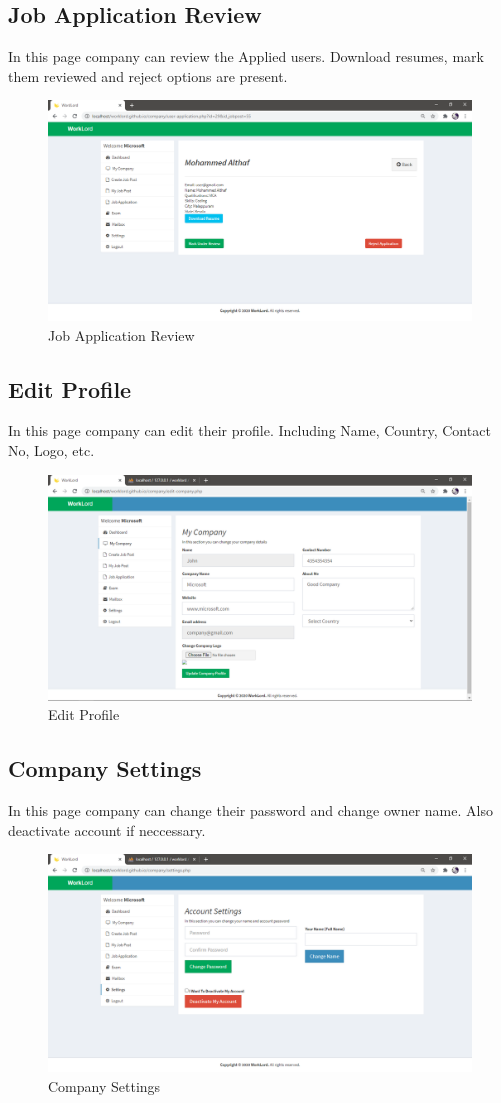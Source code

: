 \documentclass[a4paper,12pt]{report}
\begin{document}
\subsection {Job Application Review}
In this page company can review the Applied users. Download resumes, mark them reviewed and reject options are present. 
\begin{figure}[bph]
	\centering
	\includegraphics[width=.7\linewidth ]{img/screenshots/company/job_app_review}
	\caption{Job Application Review}
\end{figure}

\pagebreak

\subsection {Edit Profile}
In this page company can edit their profile. Including Name, Country, Contact No, Logo, etc.
\begin{figure}[bph]
	\centering
	\includegraphics[width=.7\linewidth ]{img/screenshots/company/company_prof_edit}
	\caption{Edit Profile}
\end{figure}

\subsection {Company Settings}
In this page company can change their password and change owner name. Also deactivate account if neccessary.
\begin{figure}[bph]
	\centering
	\includegraphics[width=.7\linewidth ]{img/screenshots/company/settings}
	\caption{Company Settings}
\end{figure}
\end{document}
